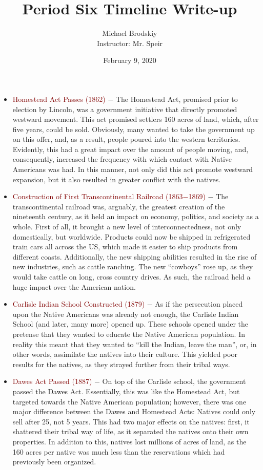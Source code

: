 \documentclass[12pt]{article}
\title{Period Six Timeline Write-up}
\date{February 9, 2020}
\author{Michael Brodskiy\\ \small Instructor: Mr. Speir}
\begin{document}
\maketitle

\begin{itemize}

  \item \textcolor{maroon}{Homestead Act Passes (1862)} $-$ The Homestead Act, promised prior to election by Lincoln, was a government initiative that directly promoted westward movement. This act promised settlers 160 acres of land, which, after five years, could be sold. Obviously, many wanted to take the government up on this offer, and, as a result, people poured into the western territories. Evidently, this had a great impact over the amount of people moving, and, consequently, increased the frequency with which contact with Native Americans was had. In this manner, not only did this act promote westward expansion, but it also resulted in greater conflict with the natives.

  \item \textcolor{maroon}{Construction of First Transcontinental Railroad (1863$-$1869)} $-$ The transcontinental railroad was, arguably, the greatest creation of the nineteenth century, as it held an impact on economy, politics, and society as a whole. First of all, it brought a new level of interconnectedness, not only domestically, but worldwide. Products could now be shipped in refrigerated train cars all across the US, which made it easier to ship products from different coasts. Additionally, the new shipping abilities resulted in the rise of new industries, such as cattle ranching. The new ``cowboys'' rose up, as they would take cattle on long, cross country drives. As such, the railroad held a huge impact over the American nation.

  \item \textcolor{maroon}{Carlisle Indian School Constructed (1879)} $-$ As if the persecution placed upon the Native Americans was already not enough, the Carlisle Indian School (and later, many more) opened up. These schools opened under the pretense that they wanted to educate the Native American population. In reality this meant that they wanted to ``kill the Indian, leave the man'', or, in other words, assimilate the natives into their culture. This yielded poor results for the natives, as they strayed further from their tribal ways.

  \item \textcolor{maroon}{Dawes Act Passed (1887)} $-$ On top of the Carlisle school, the government passed the Dawes Act. Essentially, this was like the Homestead Act, but targeted towards the Native American population; however, there was one major difference between the Dawes and Homestead Acts: Natives could only sell after 25, not 5 years. This had two major effects on the natives: first, it shattered their tribal way of life, as it separated the natives onto their own properties. In addition to this, natives lost millions of acres of land, as the 160 acres per native was much less than the reservations which had previously been organized.


\end{itemize}
\end{document}
